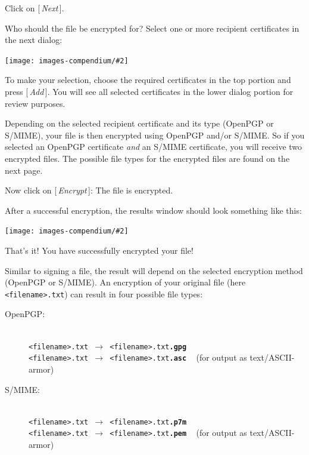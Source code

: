 \documentclass[a4paper,11pt,oneside,openright,titlepage]{scrbook}
\newcommand{\Button}[1]{[\,\textit{#1}\,]}
\newcommand{\Filename}[1]{\small{\texttt{#1}}\normalsize}
\newcommand{\IncludeImage}[2][]{
\begin{center}
  \texttt{[image: images-compendium/\#2]}%
\end{center}
}
\begin{document}
Click on \Button{Next}.

\clearpage
Who should the file be encrypted for? Select one or more recipient
certificates in the next dialog:

\IncludeImage[width=0.85\textwidth]{sc-kleopatra-encryptFile2_en}

To make your selection, choose the required certificates in the top
portion and press \Button{Add}. You will see all selected certificates
in the lower dialog portion for review purposes.

Depending on the selected recipient certificate and its type (OpenPGP
or S/MIME), your file is then encrypted using OpenPGP and/or S/MIME.
So if you selected an OpenPGP certificate \textit{and } an S/MIME
certificate, you will receive two encrypted files. The possible file
types for the encrypted files are found on the next page.


Now click on \Button{Encrypt}: The file is encrypted.

\clearpage
After a successful encryption, the results window should look
something like this:

\IncludeImage[width=0.85\textwidth]{sc-kleopatra-encryptFile3_en}

That's it! You have successfully encrypted your file!


Similar to signing a file, the result will depend on the selected
encryption method (OpenPGP or S/MIME). An encryption of your original
file (here \Filename{<filename>.txt}) can result in four possible file
types:

\begin{description}
    \item[OpenPGP:]~\\
    \Filename{<filename>.txt $\rightarrow$ <filename>.txt\textbf{.gpg}}\\
    \Filename{<filename>.txt $\rightarrow$ <filename>.txt\textbf{.asc}}
    ~ \small (for output as text/ASCII-armor)
    \normalsize

    \item[S/MIME:]~\\
    \Filename{<filename>.txt $\rightarrow$ <filename>.txt\textbf{.p7m}}\\
    \Filename{<filename>.txt $\rightarrow$ <filename>.txt\textbf{.pem}}
    ~ \small{ (for output as text/ASCII-armor)}
    \normalsize
\end{description}
\end{document}
